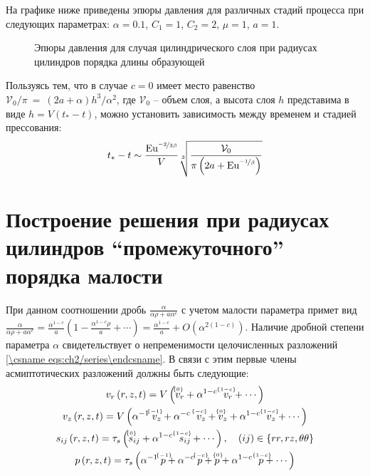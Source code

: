 На графике ниже приведены эпюры давления для различных стадий процесса при следующих параметрах: $\alpha=0.1$, $C_1=1$, $C_2=2$, $\mu=1$, $a=1$.
\begin{figure}[ht]
  \caption{Эпюры давления для случая цилиндрического слоя при радиусах цилиндров порядка длины образующей}
  \label{fig:ch2/sec5/pressure}
\end{figure}

Пользуясь тем, что в случае $c=0$ имеет место равенство $\mathcal{V}_0 / \pi~=~\left(2a + \alpha\right) h^{3} / \alpha^{2}$, где $\mathcal{V}_0$ -- объем слоя, а высота слоя $h$ представима в виде $h=V \left(t_*-t\right)$, можно установить зависимость между временем и стадией прессования:
\begin{equation}
  t_* - t \sim \frac{\text{Eu}^{\nicefrac{-2}{3\beta}}}{V}\sqrt[3]{\frac{\mathcal{V}_0}{\pi\left(2a+\text{Eu}^{\nicefrac{-1}{\beta}}\right)}}
\end{equation}

\section{Построение решения при радиусах цилиндров ``промежуточного'' порядка малости}\label{sec:ch2/sec6}

При данном соотношении дробь $\frac{\alpha}{\alpha\rho+a \alpha^c}$ с учетом малости параметра примет вид $\frac{\alpha}{\alpha\rho+a \alpha^c} = \frac{\alpha^{1-c}}{a}\left(1-\frac{\alpha^{1-c}\rho}{a}+\cdots\right) = \frac{\alpha^{1-c}}{a} + O\left(\alpha^{2\left(1-c\right)}\right)$.
Наличие дробной степени параметра $\alpha$ свидетельствует о непременимости целочисленных разложений \cref{\csname eqs:ch2/series\endcsname}. В связи с этим первые члены асмиптотических разложений должны быть следующие:
\begin{gather}
  \label{eqs:ch2/sec6/series/vr}
  v_{r}\left(r, z, t\right) = V \left(\uindex{v}{0}_{r} + \alpha^{1-c} \;\ \uindex{v}{1-c}_{r} + \cdots\right)
  \\
  \label{eqs:ch2/sec6/series/vz}
  v_{z}\left(r, z, t\right) = V \left(\alpha^{-1} \; \uindex{v}{-1}_{z} + \alpha^{-c} \;\ \uindex{v}{-c}_{z} + \uindex{v}{0}_{z} + \alpha^{1-c} \;\ \uindex{v}{1-c}_{z} + \cdots\right)
  \\
  \label{eqs:ch2/sec6/series/sij}
  s_{ij}\left(r, z, t\right) = \tau_{s} \left(\uindex{s}{0}_{ij} + \alpha^{1-c} \;\ \uindex{s}{1-c}_{ij} + \cdots\right), \quad (ij)\in\{rr, rz, \theta\theta\}
  \\
  \label{eqs:ch2/sec6/series/p}
  p\left(r, z, t \right) = \tau_{s} \left(\alpha^{-1} \; \uindex{p}{-1} + \alpha^{-c} \; \uindex{p}{-c} + \uindex{p}{0} + \alpha^{1-c} \;\ \uindex{p}{1-c} + \cdots\right)
\end{gather}

